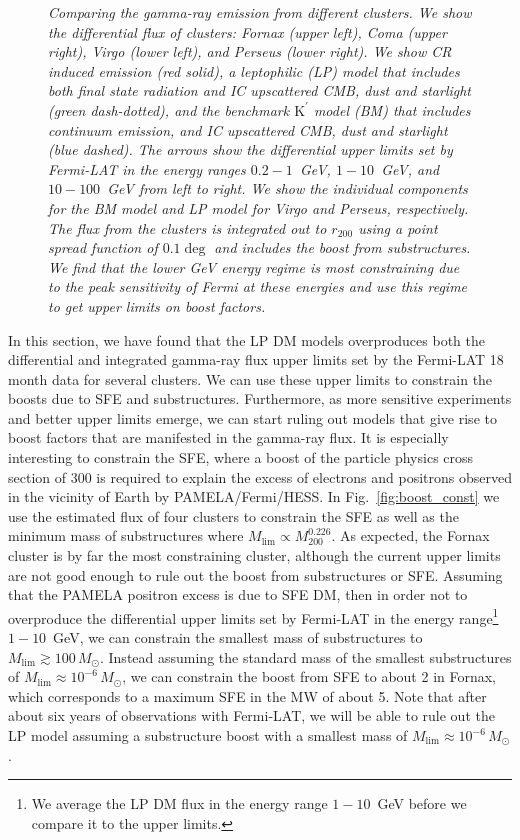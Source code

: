 \documentclass[10pt,aps,pra,reprint,amsmath,amsfonts,amssymb,showpacs,nofootinbib,floatfix]{revtex4-1}
\newcommand{\rmn}{\mathrm}
\newcommand{\msun}{M_\odot}
\newcommand{\Kp}{\rmn{K}^\prime}
\newcommand{\rvir}{r_{200}}
\newcommand{\mvir}{M_{200}}
\begin{document}
\begin{figure}
\begin{minipage}{2.0\columnwidth}
\caption{\it Comparing the gamma-ray emission from different
  clusters. We show the differential flux of clusters: Fornax
  (upper left), Coma (upper right), Virgo (lower left), and Perseus
  (lower right). We show CR induced emission (red solid), a leptophilic
  (LP) model that includes both final state radiation and IC upscattered
  CMB, dust and starlight (green dash-dotted), and the benchmark $\Kp$
  model (BM) that includes continuum emission, and IC upscattered CMB, dust
  and starlight (blue dashed). The arrows show the differential upper
  limits set by Fermi-LAT in the energy ranges $0.2-1$~GeV,
  $1-10$~GeV, and $10-100$~GeV from left to right. We show the
  individual components for the BM model and LP model for Virgo and
  Perseus, respectively. The flux from the clusters is integrated out
  to $\rvir$ using a point spread function of $0.1\deg$ and includes
  the boost from substructures. We find that the lower GeV energy
  regime is most constraining due to the peak sensitivity of Fermi at
  these energies and use this regime to get upper limits on boost
  factors.}
 \label{fig:clu_comp}
\end{minipage}
\end{figure}


In this section, we have found that the LP DM models overproduces both
the differential and integrated gamma-ray flux upper limits set by the
Fermi-LAT 18 month data for several clusters. We can use these upper
limits to constrain the boosts due to SFE and
substructures. Furthermore, as more sensitive experiments and better
upper limits emerge, we can start ruling out models that give rise to
boost factors that are manifested in the gamma-ray flux. It is
especially interesting to constrain the SFE, where a boost of the
particle physics cross section of 300 is required to explain the
excess of electrons and positrons observed in the vicinity of Earth by
PAMELA/Fermi/HESS. In Fig.~\ref{fig:boost_const} we use the estimated
flux of four clusters to constrain the SFE as well as the minimum mass
of substructures where $M_\rmn{lim}\propto\mvir^{0.226}$. As expected,
the Fornax cluster is by far the most constraining cluster, although
the current upper limits are not good enough to rule out the boost
from substructures or SFE. Assuming that the PAMELA positron excess is
due to SFE DM, then in order not to overproduce the differential upper
limits set by Fermi-LAT in the energy range\footnote{We
  average the LP DM flux in the energy range $1-10$~GeV before we
  compare it to the upper limits.}  $1-10$~GeV, we can constrain the smallest mass
of substructures to $M_\rmn{lim}\gtrsim 100\,\msun$. Instead assuming
the standard mass of the smallest substructures of $M_\rmn{lim}\approx
10^{-6}\,\msun$, we can constrain the boost from SFE to about 2 in
Fornax, which corresponds to a maximum SFE in the MW of about 5. Note
that after about six years of observations with Fermi-LAT, we will be
able to rule out the LP model assuming a substructure boost with a
smallest mass of $M_\rmn{lim} \approx 10^{-6}\,\msun$.
\end{document}
